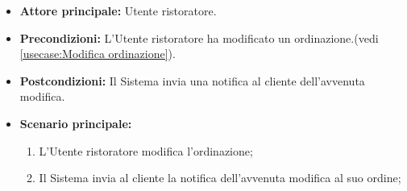 \label{usecase:Notifica modifica ordinazione al cliente}
\begin{itemize}
	\item \textbf{Attore principale:} Utente ristoratore.

	\item \textbf{Precondizioni:} L'Utente ristoratore ha modificato un ordinazione.(vedi \autoref{usecase:Modifica ordinazione}).

	\item \textbf{Postcondizioni:} Il Sistema invia una notifica al cliente dell'avvenuta modifica.

	\item \textbf{Scenario principale:}
	      \begin{enumerate}
		      \item L'Utente ristoratore modifica l'ordinazione;
		      \item Il Sistema invia al cliente la notifica dell'avvenuta modifica al suo ordine;
	      \end{enumerate}
\end{itemize}